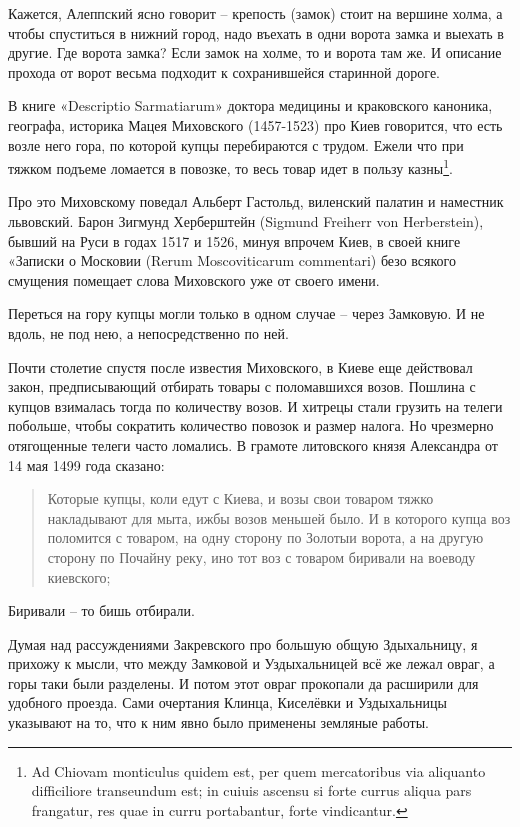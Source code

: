 Кажется, Алеппский ясно говорит – крепость (замок) стоит на вершине холма, а чтобы спуститься в нижний город, надо въехать в одни ворота замка и выехать в другие. Где ворота замка? Если замок на холме, то и ворота там же. И описание прохода от ворот весьма подходит к сохранившейся старинной дороге.

В книге «Descriptio Sarmatiarum» доктора медицины и краковского каноника, географа, историка Мацея Миховского (1457-1523) про Киев говорится, что есть возле него гора, по которой купцы перебираются с трудом. Ежели что при тяжком подъеме ломается в повозке, то весь товар идет в пользу казны\footnote{Ad Chiovam monticulus quidem est, per quem mercatoribus via aliquanto difficiliore transeundum est; in cuiuis ascensu si forte currus aliqua pars frangatur, res quae in curru portabantur, forte vindicantur.}. 

Про это Миховскому поведал Альберт Гастольд, виленский палатин и наместник львовский. Барон Зигмунд Херберштейн (Sigmund Freiherr von Herberstein), бывший на Руси в годах 1517 и 1526, минуя впрочем Киев, в своей книге «Записки о Московии (Rerum Moscoviticarum commentari) безо всякого смущения помещает слова Миховского уже от своего имени.

Переться на гору купцы могли только в одном случае – через Замковую. И не вдоль, не под нею, а непосредственно по ней.

Почти столетие спустя после известия Миховского, в Киеве еще действовал закон, предписывающий отбирать товары с поломавшихся возов. Пошлина с купцов взималась тогда по количеству возов. И хитрецы стали грузить на телеги побольше, чтобы сократить количество повозок и размер налога. Но чрезмерно отягощенные телеги часто ломались. В грамоте литовского князя Александра от 14 мая 1499 года сказано:

\begin{quote}
Которые купцы, коли едут с Киева, и возы свои товаром тяжко накладывают для мыта, ижбы возов меньшей было. И в которого купца воз поломится с товаром, на одну сторону по Золотыи ворота, а на другую сторону по Почайну реку, ино тот воз с товаром биривали на воеводу киевского;
\end{quote}

Биривали – то бишь отбирали.

Думая над рассуждениями Закревского про большую общую Здыхальницу, я прихожу к мысли, что между Замковой и Уздыхальницей всё же лежал овраг, а горы таки были разделены. И потом этот овраг прокопали да расширили для удобного проезда. Сами очертания Клинца, Киселёвки и Уздыхальницы указывают на то, что к ним явно было применены земляные работы.

